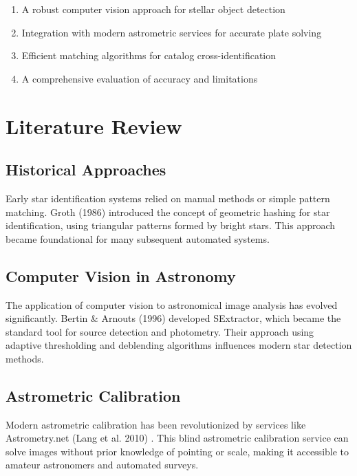 \documentclass[11pt,a4paper]{article}
\begin{document}
\begin{enumerate}
    \item A robust computer vision approach for stellar object detection
    \item Integration with modern astrometric services for accurate plate solving
    \item Efficient matching algorithms for catalog cross-identification
    \item A comprehensive evaluation of accuracy and limitations
\end{enumerate}

\section{Literature Review}

\subsection{Historical Approaches}

Early star identification systems relied on manual methods or simple pattern matching. Groth (1986) \cite{groth1986} introduced the concept of geometric hashing for star identification, using triangular patterns formed by bright stars. This approach became foundational for many subsequent automated systems.

\subsection{Computer Vision in Astronomy}

The application of computer vision to astronomical image analysis has evolved significantly. Bertin \& Arnouts (1996) \cite{sextractor} developed SExtractor, which became the standard tool for source detection and photometry. Their approach using adaptive thresholding and deblending algorithms influences modern star detection methods.

\subsection{Astrometric Calibration}

Modern astrometric calibration has been revolutionized by services like Astrometry.net (Lang et al. 2010) \cite{astrometry_net}. This blind astrometric calibration service can solve images without prior knowledge of pointing or scale, making it accessible to amateur astronomers and automated surveys.
\end{document}
